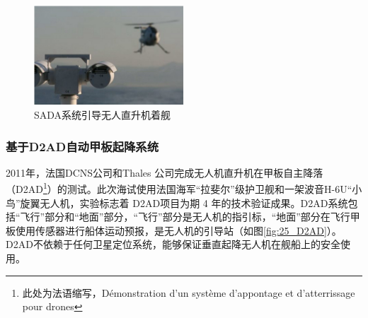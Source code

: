 \begin{figure}[!tb]   
	\centering	
	\includegraphics[width=0.5\textwidth]{Figs/24_SADA_Landing.jpg}
	\caption{SADA系统引导无人直升机着舰 }
	\label{fig:24_SADA_Landing}
\end{figure}


\subsubsection{基于D2AD自动甲板起降系统}
2011年，法国DCNS公司和Thales 公司完成无人机直升机在甲板自主降落（D2AD\footnote{此处为法语缩写，Démonstration d'un système d'appontage et d'atterrissage pour drones}）的测试。此次海试使用法国海军“拉斐尔”级护卫舰和一架波音H-6U“小鸟”旋翼无人机，实验标志着 D2AD项目为期 4 年的技术验证成果。D2AD系统包括“飞行”部分和“地面”部分，“飞行”部分是无人机的指引标，“地面”部分在飞行甲板使用传感器进行船体运动预报，是无人机的引导站（如图\ref{fig:25_D2AD}）。D2AD不依赖于任何卫星定位系统，能够保证垂直起降无人机在舰船上的安全使用。


